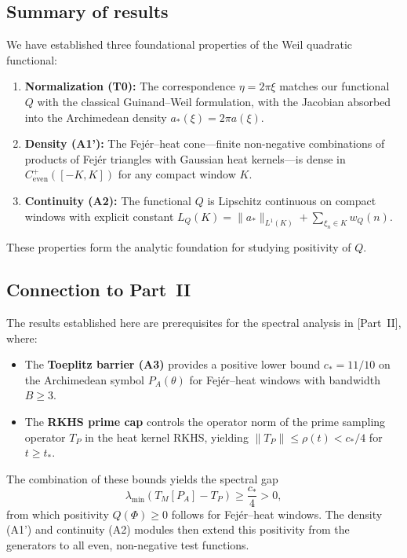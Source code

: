 \documentclass[11pt,a4paper]{article}
\theoremstyle{definition}
\theoremstyle{remark}
\begin{document}
\subsection{Summary of results}

We have established three foundational properties of the Weil quadratic functional:

\begin{enumerate}
\item \textbf{Normalization (T0):} The correspondence $\eta = 2\pi\xi$ matches our functional $Q$ with the classical Guinand--Weil formulation, with the Jacobian absorbed into the Archimedean density $a_*(\xi) = 2\pi a(\xi)$.

\item \textbf{Density (A1'):} The Fej\'er--heat cone---finite non-negative combinations of products of Fej\'er triangles with Gaussian heat kernels---is dense in $C^+_{\mathrm{even}}([-K,K])$ for any compact window $K$.

\item \textbf{Continuity (A2):} The functional $Q$ is Lipschitz continuous on compact windows with explicit constant $L_Q(K) = \|a_*\|_{L^1(K)} + \sum_{\xi_n \in K} w_Q(n)$.
\end{enumerate}

These properties form the analytic foundation for studying positivity of $Q$.

\subsection{Connection to Part~II}

The results established here are prerequisites for the spectral analysis in [Part~II], where:

\begin{itemize}
\item The \textbf{Toeplitz barrier (A3)} provides a positive lower bound $c_* = 11/10$ on the Archimedean symbol $P_A(\theta)$ for Fej\'er--heat windows with bandwidth $B \geq 3$.

\item The \textbf{RKHS prime cap} controls the operator norm of the prime sampling operator $T_P$ in the heat kernel RKHS, yielding $\|T_P\| \leq \rho(t) < c_*/4$ for $t \geq t_*$.
\end{itemize}

The combination of these bounds yields the spectral gap
\[
  \lambda_{\min}(T_M[P_A] - T_P) \geq \frac{c_*}{4} > 0,
\]
from which positivity $Q(\Phi) \geq 0$ follows for Fej\'er--heat windows. The density (A1') and continuity (A2) modules then extend this positivity from the generators to all even, non-negative test functions.
\end{document}
